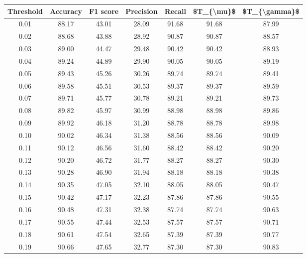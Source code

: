 \begin{tabular}{|c|c|c|c|c|c|c|}
\hline
 Threshold &  Accuracy &  F1 score &  Precision &  Recall &  \$T\_\{\textbackslash mu\}\$ &  \$T\_\{\textbackslash gamma\}\$ \\
\hline
      0.01 &     88.17 &     43.01 &      28.09 &   91.68 &      91.68 &         87.99 \\
      0.02 &     88.68 &     43.88 &      28.92 &   90.87 &      90.87 &         88.57 \\
      0.03 &     89.00 &     44.47 &      29.48 &   90.42 &      90.42 &         88.93 \\
      0.04 &     89.24 &     44.89 &      29.90 &   90.05 &      90.05 &         89.19 \\
      0.05 &     89.43 &     45.26 &      30.26 &   89.74 &      89.74 &         89.41 \\
      0.06 &     89.58 &     45.51 &      30.53 &   89.37 &      89.37 &         89.59 \\
      0.07 &     89.71 &     45.77 &      30.78 &   89.21 &      89.21 &         89.73 \\
      0.08 &     89.82 &     45.97 &      30.99 &   88.98 &      88.98 &         89.86 \\
      0.09 &     89.92 &     46.18 &      31.20 &   88.78 &      88.78 &         89.98 \\
      0.10 &     90.02 &     46.34 &      31.38 &   88.56 &      88.56 &         90.09 \\
      0.11 &     90.12 &     46.56 &      31.60 &   88.42 &      88.42 &         90.20 \\
      0.12 &     90.20 &     46.72 &      31.77 &   88.27 &      88.27 &         90.30 \\
      0.13 &     90.28 &     46.90 &      31.94 &   88.18 &      88.18 &         90.38 \\
      0.14 &     90.35 &     47.05 &      32.10 &   88.05 &      88.05 &         90.47 \\
      0.15 &     90.42 &     47.17 &      32.23 &   87.86 &      87.86 &         90.55 \\
      0.16 &     90.48 &     47.31 &      32.38 &   87.74 &      87.74 &         90.63 \\
      0.17 &     90.55 &     47.44 &      32.53 &   87.57 &      87.57 &         90.71 \\
      0.18 &     90.61 &     47.54 &      32.65 &   87.39 &      87.39 &         90.77 \\
      0.19 &     90.66 &     47.65 &      32.77 &   87.30 &      87.30 &         90.83 \\

\end{tabular}
